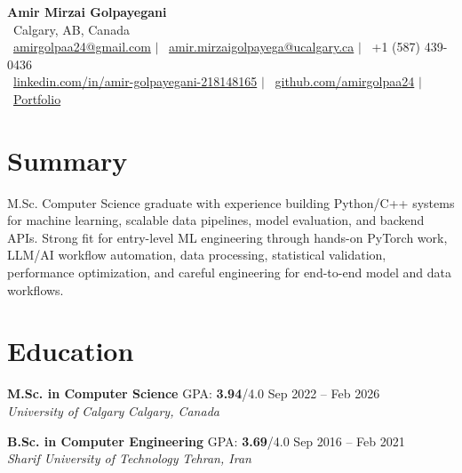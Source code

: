 \documentclass[a4paper,10pt]{article}
\newcommand{\resumeEducationSubheading}[5]{
    \textbf{#1} \hfill #2 \hfill #3 \\
    \textit{#4} \hfill \textit{#5}
}
\begin{document}

\begin{center}
    {\LARGE \textbf{Amir Mirzai Golpayegani}} \\[0.25em]
    \faMapMarker*~Calgary, AB, Canada \\[0.25em]
    \faEnvelope~\href{mailto:amirgolpaa24@gmail.com}{amirgolpaa24@gmail.com}
    $|$
    \faEnvelope~\href{mailto:amir.mirzaigolpayega@ucalgary.ca}{amir.mirzaigolpayega@ucalgary.ca}
    $|$
    \faPhone*~+1 (587) 439-0436 \\[0.25em]
    \faLinkedin~\href{https://linkedin.com/in/amir-golpayegani-218148165}{linkedin.com/in/amir-golpayegani-218148165}
    $|$
    \faGithub~\href{https://github.com/amirgolpaa24}{github.com/amirgolpaa24}
    $|$
    \faGlobe~\href{https://amir-portfolio-navy.vercel.app/}{Portfolio}
\end{center}


\section*{Summary}

M.Sc. Computer Science graduate with experience building Python/C++ systems for machine learning, scalable data pipelines, model evaluation, and backend APIs. Strong fit for entry-level ML engineering through hands-on PyTorch work, LLM/AI workflow automation, data processing, statistical validation, performance optimization, and careful engineering for end-to-end model and data workflows.


\section*{Education}

\resumeEducationSubheading
{M.Sc. in Computer Science}
{GPA: \textbf{3.94}/4.0}
{Sep 2022 -- Feb 2026}
{University of Calgary}
{Calgary, Canada}

\vspace{0.35em}

\resumeEducationSubheading
{B.Sc. in Computer Engineering}
{GPA: \textbf{3.69}/4.0}
{Sep 2016 -- Feb 2021}
{Sharif University of Technology}
{Tehran, Iran}

\end{document}

